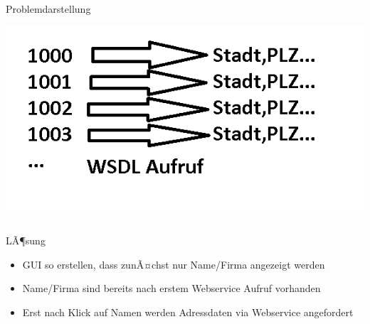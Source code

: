 \documentclass[xcolor={usenames,dvipsnames}, compress, 10pt]{beamer}
\begin{document}
\subsection*{}

\begin{frame}{Problemdarstellung}
\begin{center}

\includegraphics[width=\textheight]{Bilder/presi1.png} 

\end{center}
\end{frame}

\subsection*{}

\begin{frame}{LÃ¶sung}
\begin{center}

\begin{itemize}
\item GUI so erstellen, dass zunÃ¤chst nur Name/Firma angezeigt werden
\item Name/Firma sind bereits nach erstem Webservice Aufruf vorhanden
\item Erst nach Klick auf Namen werden Adressdaten via Webservice angefordert
\end{itemize}

\end{center}
\end{frame}

\subsection*{}
\end{document}
